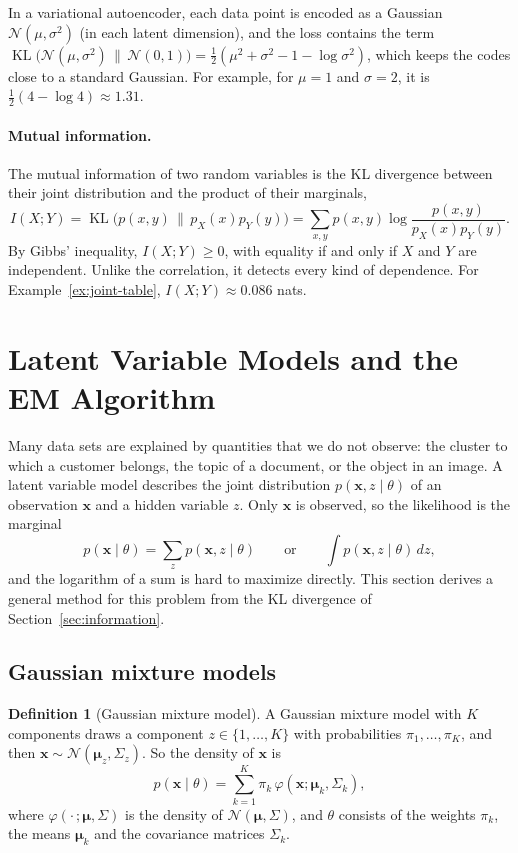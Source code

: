 \documentclass[11pt]{article}
\DeclareMathOperator{\KL}{KL}
\theoremstyle{definition}
\newtheorem{definition}{Definition}[section]
\theoremstyle{plain}
\theoremstyle{remark}
\begin{document}
In a variational autoencoder, each data point is encoded as a Gaussian $\mathcal{N}(\mu, \sigma^2)$ (in each latent dimension), and the loss contains the term $\KL\big(\mathcal{N}(\mu, \sigma^2) \,\|\, \mathcal{N}(0, 1)\big) = \frac{1}{2}(\mu^2 + \sigma^2 - 1 - \log\sigma^2)$, which keeps the codes close to a standard Gaussian. For example, for $\mu = 1$ and $\sigma = 2$, it is $\frac{1}{2}(4 - \log 4) \approx 1.31$.

\paragraph{Mutual information.} The mutual information of two random variables is the KL divergence between their joint distribution and the product of their marginals,
\[I(X; Y) = \KL\big(p(x, y) \,\|\, p_X(x)p_Y(y)\big) = \sum_{x, y} p(x, y)\log\frac{p(x, y)}{p_X(x)p_Y(y)}.\]
By Gibbs' inequality, $I(X; Y) \geq 0$, with equality if and only if $X$ and $Y$ are independent. Unlike the correlation, it detects every kind of dependence. For Example~\ref{ex:joint-table}, $I(X; Y) \approx 0.086$ nats.

\section{Latent Variable Models and the EM Algorithm}\label{sec:latent}

Many data sets are explained by quantities that we do not observe: the cluster to which a customer belongs, the topic of a document, or the object in an image. A latent variable model describes the joint distribution $p(\mathbf{x}, z \mid \theta)$ of an observation $\mathbf{x}$ and a hidden variable $z$. Only $\mathbf{x}$ is observed, so the likelihood is the marginal
\[p(\mathbf{x} \mid \theta) = \sum_z p(\mathbf{x}, z \mid \theta) \qquad \text{or} \qquad \int p(\mathbf{x}, z \mid \theta)\, dz,\]
and the logarithm of a sum is hard to maximize directly. This section derives a general method for this problem from the KL divergence of Section~\ref{sec:information}.

\subsection{Gaussian mixture models}

\begin{definition}[Gaussian mixture model]\label{def:gmm}
    A Gaussian mixture model with $K$ components draws a component $z \in \{1, \ldots, K\}$ with probabilities $\pi_1, \ldots, \pi_K$, and then $\mathbf{x} \sim \mathcal{N}(\boldsymbol{\mu}_z, \Sigma_z)$. So the density of $\mathbf{x}$ is
    \[p(\mathbf{x} \mid \theta) = \sum_{k=1}^K \pi_k\,\varphi(\mathbf{x}; \boldsymbol{\mu}_k, \Sigma_k),\]
    where $\varphi(\cdot\,; \boldsymbol{\mu}, \Sigma)$ is the density of $\mathcal{N}(\boldsymbol{\mu}, \Sigma)$, and $\theta$ consists of the weights $\pi_k$, the means $\boldsymbol{\mu}_k$ and the covariance matrices $\Sigma_k$.
\end{definition}
\end{document}
